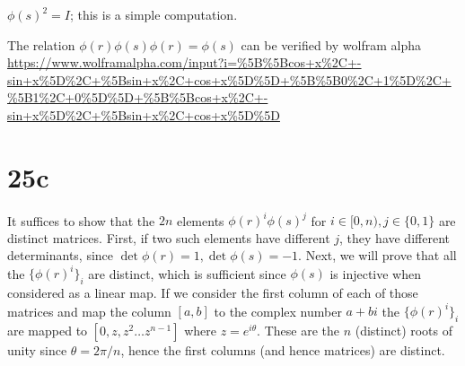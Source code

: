\documentclass{article}
\begin{document}
$\phi(s)^2 = I$; this is a simple computation.

The relation $\phi(r)\phi(s)\phi(r) = \phi(s)$ can be verified by wolfram alpha \url{https://www.wolframalpha.com/input?i=%5B%5Bcos+x%2C+-sin+x%5D%2C+%5Bsin+x%2C+cos+x%5D%5D+%5B%5B0%2C+1%5D%2C+%5B1%2C+0%5D%5D+%5B%5Bcos+x%2C+-sin+x%5D%2C+%5Bsin+x%2C+cos+x%5D%5D}

\section*{25c}

It suffices to show that the $2n$ elements $\phi(r)^i \phi(s)^j$ for $i \in [0, n), j \in \{0, 1\}$ are distinct matrices. First, if two such elements have different $j$, they have different determinants, since $\det \phi(r) = 1, \det \phi(s) = -1$. Next, we will prove that all the $\{\phi(r)^i\}_i$ are distinct, which is sufficient since $\phi(s)$ is injective when considered as a linear map. If we consider the first column of each of those matrices and map the column $[a, b]$ to the complex number $a + bi$ the $\{\phi(r)^i\}_i$ are mapped to $[0, z, z^2 \ldots z^{n-1}]$ where $z = e^{i\theta}$. These are the $n$ (distinct) roots of unity since $\theta = 2\pi/n$, hence the first columns (and hence matrices) are distinct.
\end{document}
